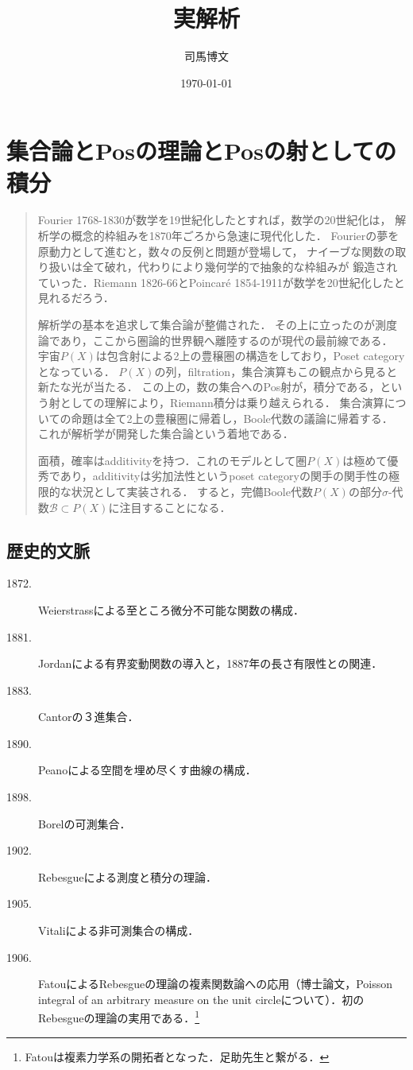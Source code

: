 \documentclass[uplatex, dvipdfmx]{jsreport}
\title{実解析}
\author{司馬博文}
\date{\today}
\renewcommand{\B}{\mathcal{B}}
\begin{document}
\tableofcontents

\chapter{集合論とPosの理論とPosの射としての積分}

\begin{quotation}
    Fourier 1768-1830が数学を19世紀化したとすれば，数学の20世紀化は，
    解析学の概念的枠組みを1870年ごろから急速に現代化した．
    Fourierの夢を原動力として進むと，数々の反例と問題が登場して，
    ナイーブな関数の取り扱いは全て破れ，代わりにより幾何学的で抽象的な枠組みが
    鍛造されていった．Riemann 1826-66とPoincaré 1854-1911が数学を20世紀化したと見れるだろう．

    解析学の基本を追求して集合論が整備された．
    その上に立ったのが測度論であり，ここから圏論的世界観へ離陸するのが現代の最前線である．
    宇宙$P(X)$は包含射による2上の豊穣圏の構造をしており，Poset categoryとなっている．
    $P(X)$の列，filtration，集合演算もこの観点から見ると新たな光が当たる．
    この上の，数の集合へのPos射が，積分である，という射としての理解により，Riemann積分は乗り越えられる．
    集合演算についての命題は全て2上の豊穣圏に帰着し，Boole代数の議論に帰着する．
    これが解析学が開発した集合論という着地である．

    面積，確率はadditivityを持つ．これのモデルとして圏$P(X)$は極めて優秀であり，additivityは劣加法性というposet categoryの関手の関手性の極限的な状況として実装される．
    すると，完備Boole代数$P(X)$の部分$\sigma$-代数$\B\subset P(X)$に注目することになる．
\end{quotation}

\section{歴史的文脈}

\begin{history}\mbox{}
    \begin{description}
        \item[1872.] Weierstrassによる至ところ微分不可能な関数の構成．
        \item[1881.] Jordanによる有界変動関数の導入と，1887年の長さ有限性との関連．
        \item[1883.] Cantorの３進集合．
        \item[1890.] Peanoによる空間を埋め尽くす曲線の構成．
        \item[1898.] Borelの可測集合．
        \item[1902.] Rebesgueによる測度と積分の理論．
        \item[1905.] Vitaliによる非可測集合の構成．
        \item[1906.] FatouによるRebesgueの理論の複素関数論への応用（博士論文，Poisson integral of an arbitrary measure on the unit circleについて）．初のRebesgueの理論の実用である．\footnote{Fatouは複素力学系の開拓者となった．足助先生と繋がる．}
    \end{description}
\end{history}
\end{document}
